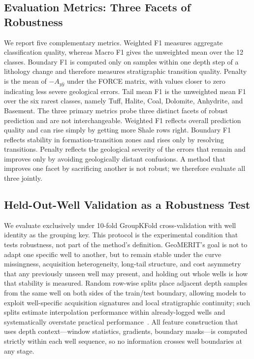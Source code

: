 \documentclass[bdcc,article,submit,pdftex,moreauthors]{Definitions/mdpi}
\begin{document}
\subsection{Evaluation Metrics: Three Facets of Robustness}
\label{sec:metrics}
We report five complementary metrics. Weighted F1 measures aggregate classification quality,
whereas Macro F1 gives the unweighted mean over the 12 classes. Boundary F1 is computed only
on samples within one depth step of a lithology change and therefore measures stratigraphic
transition quality. Penalty is the mean of $-A_{y\hat y}$ under the FORCE matrix, with values
closer to zero indicating less severe geological errors. Tail mean F1 is the unweighted mean
F1 over the six rarest classes, namely Tuff, Halite, Coal, Dolomite, Anhydrite, and Basement. The three primary metrics probe three distinct facets
of robust prediction and are not interchangeable. Weighted F1 reflects overall prediction
quality and can rise simply by getting more Shale rows right. Boundary F1 reflects stability
in formation-transition zones and rises only by resolving transitions. Penalty reflects the
geological severity of the errors that remain and improves only by avoiding geologically
distant confusions. A method that improves one facet by sacrificing another is not robust;
we therefore evaluate all three jointly.

\subsection{Held-Out-Well Validation as a Robustness Test}
\label{sec:protocol}
We evaluate exclusively under 10-fold GroupKFold cross-validation with well identity as the
grouping key. This protocol is the experimental condition that tests robustness, not part of
the method's definition. GeoMERIT's goal is not to adapt one specific well to another, but to
remain stable under the curve missingness, acquisition heterogeneity, long-tail structure,
and cost asymmetry that any previously unseen well may present, and holding out whole wells
is how that stability is measured. Random row-wise splits place adjacent depth samples from
the same well on both sides of the train/test boundary, allowing models to exploit
well-specific acquisition signatures and local stratigraphic continuity; such splits estimate
interpolation performance within already-logged wells and systematically overstate practical
performance~\cite{rosenblatt2024,roberts2017cv,mila2022nndm}. All feature construction that
uses depth context---window statistics, gradients, boundary masks---is computed strictly
within each well sequence, so no information crosses well boundaries at any stage.
\end{document}
